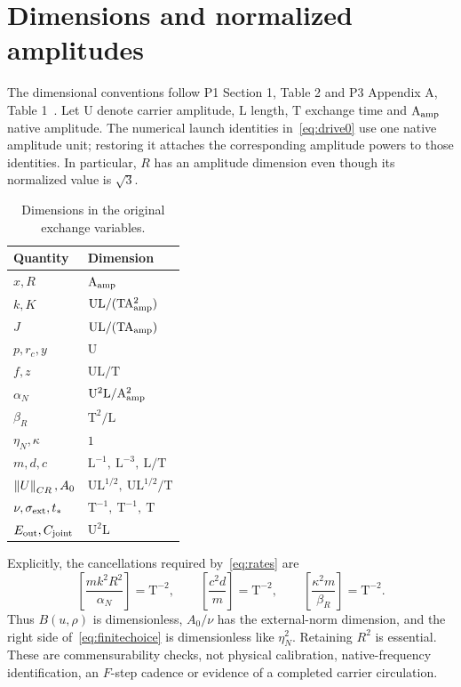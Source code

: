 \section{Dimensions and normalized amplitudes}\label{sec:units}%
The dimensional conventions follow P1 Section 1, Table 2 and P3 Appendix A, Table 1~\cite{p1,p3}. Let $\mathrm U$ denote carrier amplitude, $\mathrm L$ length, $\mathrm T$ exchange time and $\mathrm A_{\rm amp}$ native amplitude. The numerical launch identities in~\eqref{eq:drive0} use one native amplitude unit; restoring it attaches the corresponding amplitude powers to those identities. In particular, $R$ has an amplitude dimension even though its normalized value is $\sqrt3$.

\begin{table}[ht]
\centering
\caption{Dimensions in the original exchange variables.}\label{tab:units}%
\renewcommand{\arraystretch}{1.17}
\begin{tabularx}{\textwidth}{@{}lY@{}}
\toprule
Quantity & Dimension\\
\midrule
$x,R$ & $\mathrm A_{\rm amp}$\\
$k,K$ & $\mathrm U\mathrm L/(\mathrm T\mathrm A_{\rm amp}^2)$\\
$J$ & $\mathrm U\mathrm L/(\mathrm T\mathrm A_{\rm amp})$\\
$p,r_c,y$ & $\mathrm U$\\
$f,z$ & $\mathrm U\mathrm L/\mathrm T$\\
$\alpha_N$ & $\mathrm U^2\mathrm L/\mathrm A_{\rm amp}^2$\\
$\beta_R$ & $\mathrm T^2/\mathrm L$\\
$\eta_N,\kappa$ & $1$\\
$m,d,c$ & $\mathrm L^{-1},\ \mathrm L^{-3},\ \mathrm L/\mathrm T$\\
$\left\|U\right\|_{CR},A_0$ & $\mathrm U\mathrm L^{1/2},\ \mathrm U\mathrm L^{1/2}/\mathrm T$\\
$\nu,\sigma_{\rm ext},t_*$ & $\mathrm T^{-1},\ \mathrm T^{-1},\ \mathrm T$\\
$E_{\rm out},C_{\rm joint}$ & $\mathrm U^2\mathrm L$\\
\bottomrule
\end{tabularx}
\end{table}

Explicitly, the cancellations required by~\eqref{eq:rates} are
\begin{equation}\label{eq:unitchecks}%
\left[\frac{mk^2R^2}{\alpha_N}\right]=\mathrm T^{-2},
\qquad
\left[\frac{c^2d}{m}\right]=\mathrm T^{-2},
\qquad
\left[\frac{\kappa^2m}{\beta_R}\right]=\mathrm T^{-2}.
\end{equation}
Thus $B(u,\rho)$ is dimensionless, $A_0/\nu$ has the external-norm dimension, and the right side of~\eqref{eq:finitechoice} is dimensionless like $\eta_N^2$. Retaining $R^2$ is essential. These are commensurability checks, not physical calibration, native-frequency identification, an $F$-step cadence or evidence of a completed carrier circulation.
